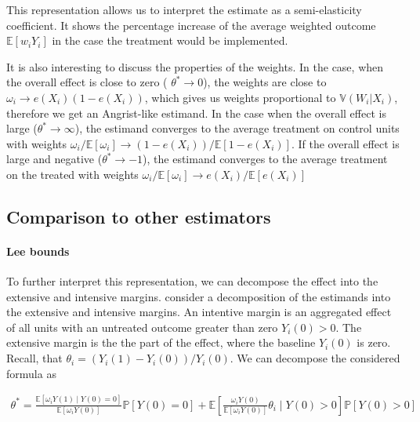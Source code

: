 \documentclass[a4paper,12pt]{article}
\theoremstyle{plain}
\begin{document}

This representation allows us to interpret the estimate as a semi-elasticity coefficient. It shows the percentage increase of the average weighted outcome $\mathbb{E}[w_iY_i]$ in the case the treatment would be implemented.

It is also interesting to discuss the properties of the weights. In the case, when the overall effect is close to zero ( $\theta^\ast \to 0$), the weights are close to $\omega_i \to e(X_i)(1 - e(X_i))$, which gives us weights proportional to $\mathbb{V}(W_i|X_i)$, therefore we get an Angrist-like estimand. In the case when the overall effect is large ($\theta^\ast \to \infty$), the estimand converges to the average treatment on control units with weights $\omega_i / \mathbb{E}[\omega_i] \to (1 - e(X_i)) / \mathbb{E}[1 - e(X_i)]$. If the overall effect is large and negative ($\theta^\ast \to -1$), the estimand converges to the average treatment on the treated with weights $\omega_i / \mathbb{E}[\omega_i] \to e(X_i) / \mathbb{E}[e(X_i)]$


\subsection{Comparison to other estimators}

\paragraph{Lee bounds}

To further interpret this representation, we can decompose the effect into the extensive and intensive margins. \citet{chen2022log} consider a decomposition of the estimands into the extensive and intensive margins. An intentive margin is an aggregated effect of all units with an untreated outcome greater than zero $Y_i(0) > 0$. The extensive margin is the the part of the effect, where the baseline $Y_i(0)$ is zero. Recall, that $\theta_i = (Y_i(1) - Y_i(0)) / Y_i(0)$. We can decompose the considered formula as

    
\begin{gather}
      \theta^\ast = \frac{\mathbb{E}[\omega_i Y(1) \mid Y(0) = 0]}{\mathbb{E}[\omega_i Y(0)]} \mathbb{P}[Y(0) = 0] + \mathbb{E}\left[\frac{\omega_i Y(0)}{\mathbb{E}[\omega_i Y(0)]} \theta_i \mid Y(0) > 0\right] \mathbb{P}[Y(0) > 0]\label{formula:convex_margins}
\end{gather} %
\end{document}
